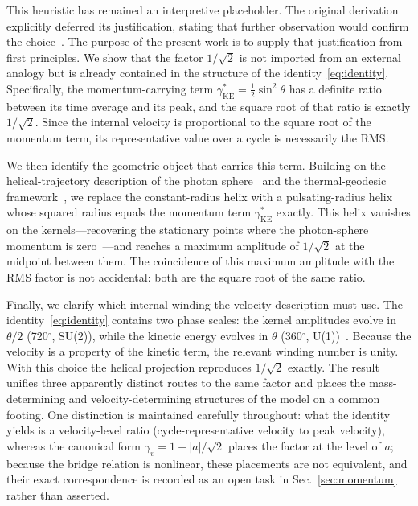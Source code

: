 \documentclass[%
 reprint, amsmath,amssymb, aps, prb, ]{revtex4-2}
\numberwithin{equation}{section}
\newcommand{\gKE}{\gamma^{*}_{\text{KE}}}
\begin{document}
This heuristic has remained an interpretive placeholder. The original derivation explicitly deferred its justification, stating that further observation would confirm the choice~\cite{hanamura10}. The purpose of the present work is to supply that justification from first principles. We show that the factor $1/\sqrt{2}$ is not imported from an external analogy but is already contained in the structure of the identity~\eqref{eq:identity}. Specifically, the momentum-carrying term $\gKE=\tfrac{1}{2}\sin^2\theta$ has a definite ratio between its time average and its peak, and the square root of that ratio is exactly $1/\sqrt{2}$. Since the internal velocity is proportional to the square root of the momentum term, its representative value over a cycle is necessarily the RMS.

We then identify the geometric object that carries this term. Building on the helical-trajectory description of the photon sphere~\cite{hanamura51} and the thermal-geodesic framework~\cite{hanamura24}, we replace the constant-radius helix with a pulsating-radius helix whose squared radius equals the momentum term $\gKE$ exactly. This helix vanishes on the kernels---recovering the stationary points where the photon-sphere momentum is zero~\cite{hanamura07}---and reaches a maximum amplitude of $1/\sqrt{2}$ at the midpoint between them. The coincidence of this maximum amplitude with the RMS factor is not accidental: both are the square root of the same ratio.

Finally, we clarify which internal winding the velocity description must use. The identity~\eqref{eq:identity} contains two phase scales: the kernel amplitudes evolve in $\theta/2$ (720$^\circ$, SU(2)), while the kinetic energy evolves in $\theta$ (360$^\circ$, U(1))~\cite{hanamura01,hanamura19}. Because the velocity is a property of the kinetic term, the relevant winding number is unity. With this choice the helical projection reproduces $1/\sqrt{2}$ exactly. The result unifies three apparently distinct routes to the same factor and places the mass-determining and velocity-determining structures of the model on a common footing. One distinction is maintained carefully throughout: what the identity yields is a velocity-level ratio (cycle-representative velocity to peak velocity), whereas the canonical form $\gamma_v = 1+\lvert a\rvert/\sqrt{2}$ places the factor at the level of $a$; because the bridge relation is nonlinear, these placements are not equivalent, and their exact correspondence is recorded as an open task in Sec.~\ref{sec:momentum} rather than asserted.
\end{document}

